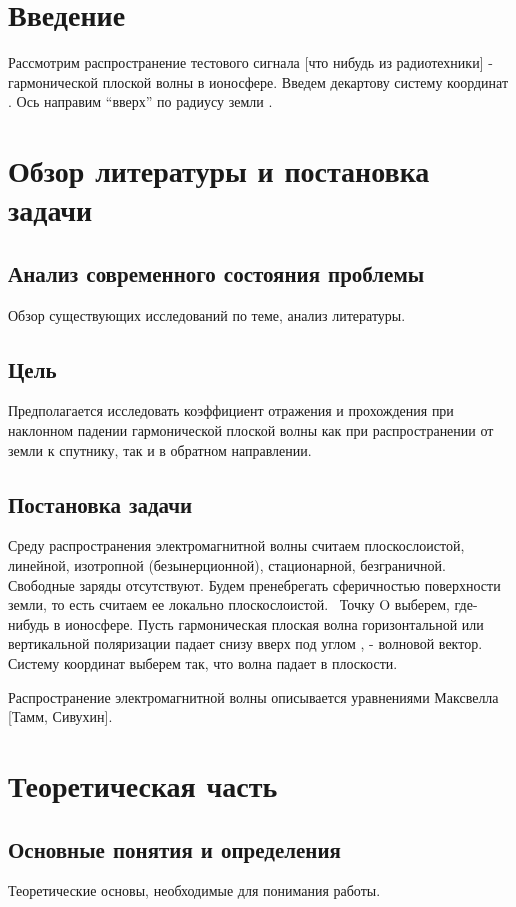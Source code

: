 \documentclass[a4paper,14pt]{extreport} %
\begin{document}
\chapter*{Введение}
Рассмотрим распространение тестового сигнала [что нибудь из радиотехники] - гармонической плоской волны в ионосфере. Введем декартову систему координат . Ось  направим “вверх” по радиусу земли . 

\chapter{Обзор литературы и постановка задачи}
\section{Анализ современного состояния проблемы}
Обзор существующих исследований по теме, анализ литературы.

\section {Цель}
Предполагается исследовать коэффициент отражения и прохождения при наклонном падении гармонической плоской волны как при распространении от земли к спутнику, так и в обратном направлении.
\section{Постановка задачи}
Среду распространения электромагнитной волны считаем плоскослоистой, линейной, изотропной (безынерционной), стационарной, безграничной. Свободные заряды отсутствуют. 
Будем пренебрегать сферичностью поверхности земли, то есть считаем ее локально плоскослоистой. 
Точку O выберем, где-нибудь в ионосфере. 
Пусть гармоническая плоская волна горизонтальной или вертикальной поляризации падает снизу вверх под углом , - волновой вектор. 
Систему координат выберем так, что волна падает в плоскости.

Распространение электромагнитной волны описывается уравнениями Максвелла [Тамм, Сивухин].

\chapter{Теоретическая часть}
\section{Основные понятия и определения}
Теоретические основы, необходимые для понимания работы.
\end{document}
